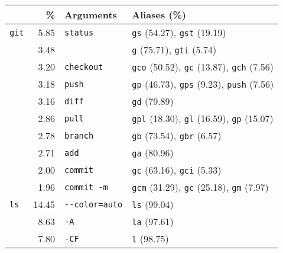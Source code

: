 \newcommand{\numx}[1]{{\footnotesize (\num{#1})}}
\begin{adjustbox}{width=\columnwidth,center}
\begin{tabular}{@{}l@{}rll@{}}
    \toprule
                &           \% &            Arguments &                                                                 Aliases (\%) \\
    \midrule
     \verb|git| &   \num{5.85} &        \verb|status| &                              \verb|gs| \numx{54.27}, \verb|gst| \numx{19.19} \\
                &   \num{3.48} &              \verb|| &                                \verb|g| \numx{75.71}, \verb|gti| \numx{5.74} \\
                &   \num{3.20} &      \verb|checkout| &      \verb|gco| \numx{50.52}, \verb|gc| \numx{13.87}, \verb|gch| \numx{7.56} \\
                &   \num{3.18} &          \verb|push| &      \verb|gp| \numx{46.73}, \verb|gps| \numx{9.23}, \verb|push| \numx{7.56} \\
                &   \num{3.16} &          \verb|diff| &                                                       \verb|gd| \numx{79.89} \\
                &   \num{2.86} &          \verb|pull| &      \verb|gpl| \numx{18.30}, \verb|gl| \numx{16.59}, \verb|gp| \numx{15.07} \\
                &   \num{2.78} &        \verb|branch| &                               \verb|gb| \numx{73.54}, \verb|gbr| \numx{6.57} \\
                &   \num{2.71} &           \verb|add| &                                                       \verb|ga| \numx{80.96} \\
                &   \num{2.00} &        \verb|commit| &                               \verb|gc| \numx{63.16}, \verb|gci| \numx{5.33} \\
                &   \num{1.96} &     \verb|commit -m| &       \verb|gcm| \numx{31.29}, \verb|gc| \numx{25.18}, \verb|gm| \numx{7.97} \\
    \midrule
      \verb|ls| &  \num{14.45} &  \verb|--color=auto| &                                                       \verb|ls| \numx{99.04} \\
                &   \num{8.63} &            \verb|-A| &                                                       \verb|la| \numx{97.61} \\
                &   \num{7.80} &           \verb|-CF| &                                                        \verb|l| \numx{98.75} \\

\end{tabular}
\end{adjustbox}
